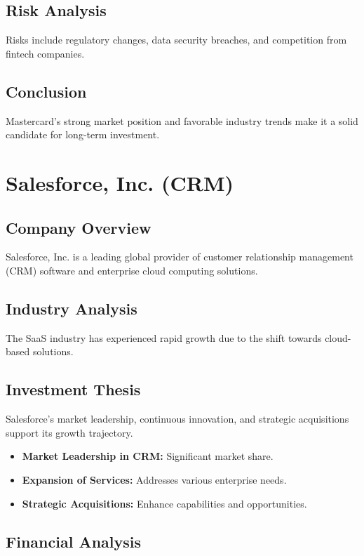 \documentclass[12pt]{report}
\begin{document}
\section{Risk Analysis}
Risks include regulatory changes, data security breaches, and competition from fintech companies.

\section{Conclusion}
Mastercard's strong market position and favorable industry trends make it a solid candidate for long-term investment.

\chapter{Salesforce, Inc. (CRM)}
\section{Company Overview}
Salesforce, Inc. is a leading global provider of customer relationship management (CRM) software and enterprise cloud computing solutions.

\section{Industry Analysis}
The SaaS industry has experienced rapid growth due to the shift towards cloud-based solutions.

\section{Investment Thesis}
Salesforce's market leadership, continuous innovation, and strategic acquisitions support its growth trajectory.

\begin{itemize}
    \item \textbf{Market Leadership in CRM:} Significant market share.
    \item \textbf{Expansion of Services:} Addresses various enterprise needs.
    \item \textbf{Strategic Acquisitions:} Enhance capabilities and opportunities.
\end{itemize}

\section{Financial Analysis}
\end{document}
